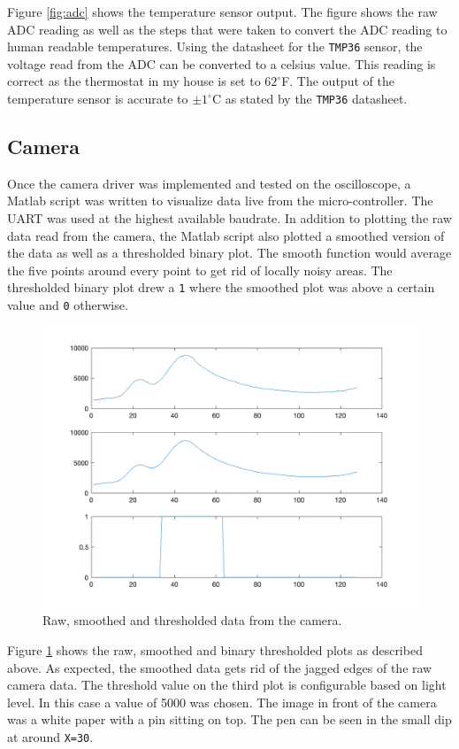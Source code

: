 \documentclass[CMPE]{../KGCOEReport}
\def\code#1{\texttt{#1}}
\begin{document}
	Figure \ref{fig:adc} shows the temperature sensor output. The figure
	shows the raw ADC reading as well as the steps that were taken to convert
	the ADC reading to human readable temperatures. Using the datasheet for the
	\code{TMP36} sensor, the voltage read from the ADC can be converted to a celsius
	value. This reading is correct as the thermostat in my house is set to
	$62^\circ$F. The output of the temperature sensor is accurate to
	$\pm 1^\circ$C as stated by the \code{TMP36} datasheet.

	\subsection*{Camera}

	Once the camera driver was implemented and tested on the oscilloscope, a Matlab
	script was written to visualize data live from the micro-controller. The UART was
	used at the highest available baudrate. In addition to plotting the raw data read
	from the camera, the Matlab script also plotted a smoothed
	version of the data as well as a thresholded binary plot. The smooth function would
	average the five points around every point to get rid of locally noisy areas. The
	thresholded binary plot drew a \code{1} where the smoothed plot was above a certain
	value and \code{0} otherwise.

	\begin{figure}[h!]
        \centering
        \includegraphics[width=12cm]{cam}
        \caption{Raw, smoothed and thresholded data from the camera.}
        \label{fig:cam}
	\end{figure}

	Figure \ref{fig:cam} shows the raw, smoothed and binary thresholded plots as
	described above. As expected, the smoothed data gets rid of the jagged edges of
	the raw camera data. The threshold value on the third plot is configurable based
	on light level. In this case a value of 5000 was chosen. The image in front of the
	camera was a white paper with a pin sitting on top. The pen can be seen in the small
	dip at around \code{X=30}.
\end{document}
